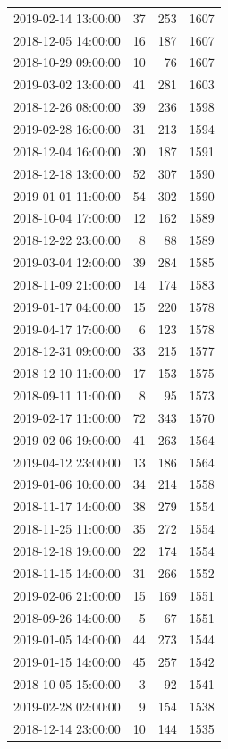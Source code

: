 \begin{tabular}{lrrr}
2019-02-14 13:00:00 & 37 & 253 & 1607 \\
2018-12-05 14:00:00 & 16 & 187 & 1607 \\
2018-10-29 09:00:00 & 10 & 76 & 1607 \\
2019-03-02 13:00:00 & 41 & 281 & 1603 \\
2018-12-26 08:00:00 & 39 & 236 & 1598 \\
2019-02-28 16:00:00 & 31 & 213 & 1594 \\
2018-12-04 16:00:00 & 30 & 187 & 1591 \\
2018-12-18 13:00:00 & 52 & 307 & 1590 \\
2019-01-01 11:00:00 & 54 & 302 & 1590 \\
2018-10-04 17:00:00 & 12 & 162 & 1589 \\
2018-12-22 23:00:00 & 8 & 88 & 1589 \\
2019-03-04 12:00:00 & 39 & 284 & 1585 \\
2018-11-09 21:00:00 & 14 & 174 & 1583 \\
2019-01-17 04:00:00 & 15 & 220 & 1578 \\
2019-04-17 17:00:00 & 6 & 123 & 1578 \\
2018-12-31 09:00:00 & 33 & 215 & 1577 \\
2018-12-10 11:00:00 & 17 & 153 & 1575 \\
2018-09-11 11:00:00 & 8 & 95 & 1573 \\
2019-02-17 11:00:00 & 72 & 343 & 1570 \\
2019-02-06 19:00:00 & 41 & 263 & 1564 \\
2019-04-12 23:00:00 & 13 & 186 & 1564 \\
2019-01-06 10:00:00 & 34 & 214 & 1558 \\
2018-11-17 14:00:00 & 38 & 279 & 1554 \\
2018-11-25 11:00:00 & 35 & 272 & 1554 \\
2018-12-18 19:00:00 & 22 & 174 & 1554 \\
2018-11-15 14:00:00 & 31 & 266 & 1552 \\
2019-02-06 21:00:00 & 15 & 169 & 1551 \\
2018-09-26 14:00:00 & 5 & 67 & 1551 \\
2019-01-05 14:00:00 & 44 & 273 & 1544 \\
2019-01-15 14:00:00 & 45 & 257 & 1542 \\
2018-10-05 15:00:00 & 3 & 92 & 1541 \\
2019-02-28 02:00:00 & 9 & 154 & 1538 \\
2018-12-14 23:00:00 & 10 & 144 & 1535 \\

\end{tabular}

